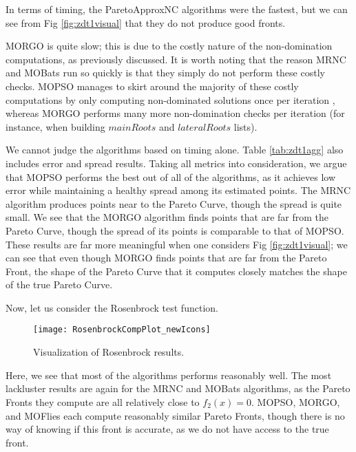 \documentclass[letterpaper, 10 pt, conference]{ieeeconf}  %
\begin{document}
\vspace*{-\baselineskip}

In terms of timing, the ParetoApproxNC algorithms were the fastest, but we can see from Fig \ref{fig:zdt1visual} that they do not produce good fronts. 

MORGO is quite slow; this is due to the costly nature of the non-domination computations, as previously discussed. It is worth noting that the reason MRNC and MOBats run so quickly is that they simply do not perform these costly checks. MOPSO manages to skirt around the majority of these costly computations by only computing non-dominated solutions once per iteration \cite{MOPSOCode}, whereas MORGO performs many more non-domination checks per iteration (for instance, when building ${mainRoots}$ and ${lateralRoots}$ lists). 

We cannot judge the algorithms based on timing alone. Table \ref{tab:zdt1agg} also includes error and spread results. Taking all metrics into consideration, we argue that MOPSO performs the best out of all of the algorithms, as it achieves low error while maintaining a healthy spread among its estimated points. The MRNC algorithm produces points near to the Pareto Curve, though the spread is quite small. We see that the MORGO algorithm finds points that are far from the Pareto Curve, though the spread of its points is comparable to that of MOPSO. These results are far more meaningful when one considers Fig \ref{fig:zdt1visual}; we can see that even though MORGO finds points that are far from the Pareto Front, the shape of the Pareto Curve that it computes closely matches the shape of the true Pareto Curve. 

Now, let us consider the Rosenbrock test function.


\begin{figure}[h]
\texttt{[image: RosenbrockCompPlot\_newIcons]}
\caption{Visualization of Rosenbrock results.}
\label{fig:rosvis}
\end{figure}

Here, we see that most of the algorithms performs reasonably well. The most lackluster results are again for the MRNC and MOBats algorithms, as the Pareto Fronts they compute are all relatively close to $f_2(x) = 0$. MOPSO, MORGO, and MOFlies each compute reasonably similar Pareto Fronts, though there is no way of knowing if this front is accurate, as we do not have access to the true front.
\end{document}
